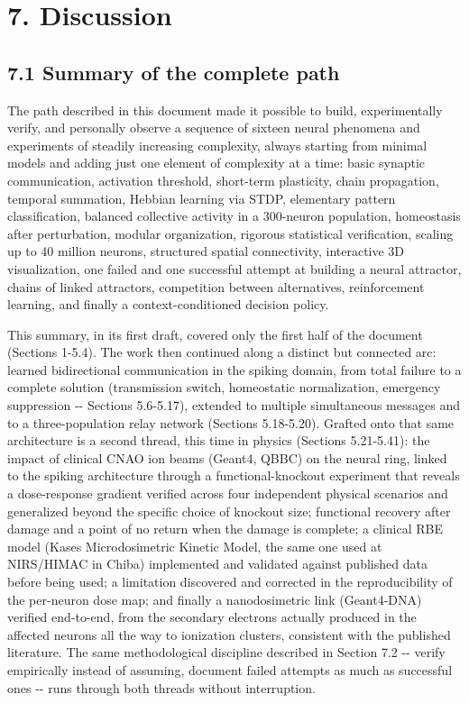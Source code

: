 \documentclass[
  english,
]{article}
\begin{document}
\section{7. Discussion}\label{discussion}

\subsection{7.1 Summary of the complete path}\label{summary-of-the-complete-path}

The path described in this document made it possible to build, experimentally verify, and personally observe a sequence of sixteen neural phenomena and experiments of steadily increasing complexity, always starting from minimal models and adding just one element of complexity at a time: basic synaptic communication, activation threshold, short-term plasticity, chain propagation, temporal summation, Hebbian learning via STDP, elementary pattern classification, balanced collective activity in a 300-neuron population, homeostasis after perturbation, modular organization, rigorous statistical verification, scaling up to 40 million neurons, structured spatial connectivity, interactive 3D visualization, one failed and one successful attempt at building a neural attractor, chains of linked attractors, competition between alternatives, reinforcement learning, and finally a context-conditioned decision policy.

This summary, in its first draft, covered only the first half of the document (Sections 1-5.4). The work then continued along a distinct but connected arc: learned bidirectional communication in the spiking domain, from total failure to a complete solution (transmission switch, homeostatic normalization, emergency suppression -\/- Sections 5.6-5.17), extended to multiple simultaneous messages and to a three-population relay network (Sections 5.18-5.20). Grafted onto that same architecture is a second thread, this time in physics (Sections 5.21-5.41): the impact of clinical CNAO ion beams (Geant4, QBBC) on the neural ring, linked to the spiking architecture through a functional-knockout experiment that reveals a dose-response gradient verified across four independent physical scenarios and generalized beyond the specific choice of knockout size; functional recovery after damage and a point of no return when the damage is complete; a clinical RBE model (Kase\textquotesingle s Microdosimetric Kinetic Model, the same one used at NIRS/HIMAC in Chiba) implemented and validated against published data before being used; a limitation discovered and corrected in the reproducibility of the per-neuron dose map; and finally a nanodosimetric link (Geant4-DNA) verified end-to-end, from the secondary electrons actually produced in the affected neurons all the way to ionization clusters, consistent with the published literature. The same methodological discipline described in Section 7.2 -\/- verify empirically instead of assuming, document failed attempts as much as successful ones -\/- runs through both threads without interruption.
\end{document}
